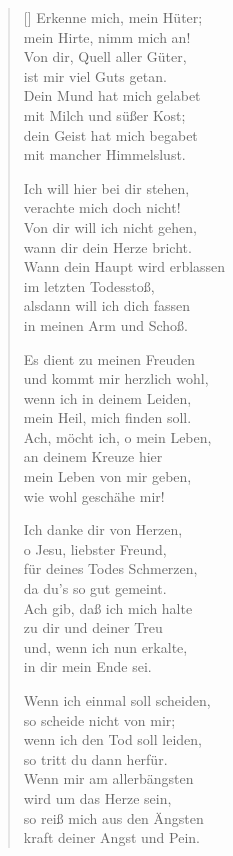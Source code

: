 \begin{multicols}{2}
\begin{verse}[\versewidth]
 Erkenne mich, mein Hüter;\\
mein Hirte, nimm mich an!\\
Von dir, Quell aller Güter,\\
ist mir viel Guts getan.\\
Dein Mund hat mich gelabet\\
mit Milch und süßer Kost;\\
dein Geist hat mich begabet\\
mit mancher Himmelslust.

 Ich will hier bei dir stehen,\\
verachte mich doch nicht!\\
Von dir will ich nicht gehen,\\
wann dir dein Herze bricht.\\
Wann dein Haupt wird erblassen\\
im letzten Todesstoß,\\
alsdann will ich dich fassen\\
in meinen Arm und Schoß.

 Es dient zu meinen Freuden\\
und kommt mir herzlich wohl,\\
wenn ich in deinem Leiden,\\
mein Heil, mich finden soll.\\
Ach, möcht ich, o mein Leben,\\
an deinem Kreuze hier\\
mein Leben von mir geben,\\
wie wohl geschähe mir!

 Ich danke dir von Herzen,\\
o Jesu, liebster Freund,\\
für deines Todes Schmerzen,\\
da du's so gut gemeint.\\
Ach gib, daß ich mich halte\\
zu dir und deiner Treu\\
und, wenn ich nun erkalte,\\
in dir mein Ende sei.

 Wenn ich einmal soll scheiden,\\
so scheide nicht von mir;\\
wenn ich den Tod soll leiden,\\
so tritt du dann herfür.\\
Wenn mir am allerbängsten\\
wird um das Herze sein,\\
so reiß mich aus den Ängsten\\
kraft deiner Angst und Pein.


\end{verse}
\end{multicols}
